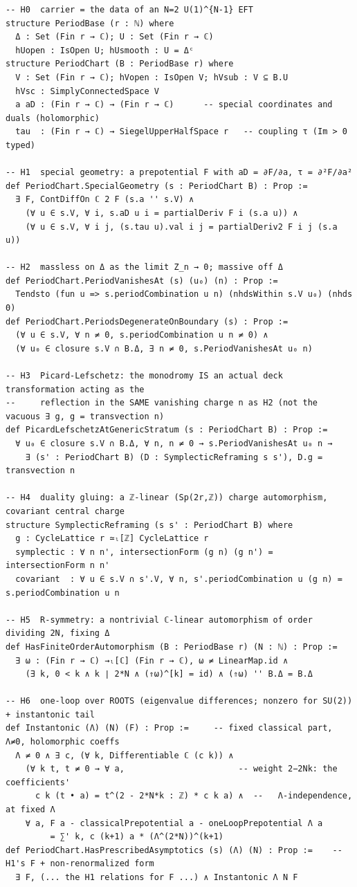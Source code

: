 \documentclass{article}
\theoremstyle{plain}
\theoremstyle{definition}
\numberwithin{equation}{section}
\begin{document}
\begin{Verbatim}
-- H0  carrier = the data of an N=2 U(1)^{N-1} EFT
structure PeriodBase (r : ℕ) where
  Δ : Set (Fin r → ℂ); U : Set (Fin r → ℂ)
  hUopen : IsOpen U; hUsmooth : U = Δᶜ
structure PeriodChart (B : PeriodBase r) where
  V : Set (Fin r → ℂ); hVopen : IsOpen V; hVsub : V ⊆ B.U
  hVsc : SimplyConnectedSpace V
  a aD : (Fin r → ℂ) → (Fin r → ℂ)      -- special coordinates and duals (holomorphic)
  tau  : (Fin r → ℂ) → SiegelUpperHalfSpace r   -- coupling τ (Im > 0 typed)

-- H1  special geometry: a prepotential F with aD = ∂F/∂a, τ = ∂²F/∂a²
def PeriodChart.SpecialGeometry (s : PeriodChart B) : Prop :=
  ∃ F, ContDiffOn ℂ 2 F (s.a '' s.V) ∧
    (∀ u ∈ s.V, ∀ i, s.aD u i = partialDeriv F i (s.a u)) ∧
    (∀ u ∈ s.V, ∀ i j, (s.tau u).val i j = partialDeriv2 F i j (s.a u))

-- H2  massless on Δ as the limit Z_n → 0; massive off Δ
def PeriodChart.PeriodVanishesAt (s) (u₀) (n) : Prop :=
  Tendsto (fun u => s.periodCombination u n) (nhdsWithin s.V u₀) (nhds 0)
def PeriodChart.PeriodsDegenerateOnBoundary (s) : Prop :=
  (∀ u ∈ s.V, ∀ n ≠ 0, s.periodCombination u n ≠ 0) ∧
  (∀ u₀ ∈ closure s.V ∩ B.Δ, ∃ n ≠ 0, s.PeriodVanishesAt u₀ n)

-- H3  Picard-Lefschetz: the monodromy IS an actual deck transformation acting as the
--     reflection in the SAME vanishing charge n as H2 (not the vacuous ∃ g, g = transvection n)
def PicardLefschetzAtGenericStratum (s : PeriodChart B) : Prop :=
  ∀ u₀ ∈ closure s.V ∩ B.Δ, ∀ n, n ≠ 0 → s.PeriodVanishesAt u₀ n →
    ∃ (s' : PeriodChart B) (D : SymplecticReframing s s'), D.g = transvection n

-- H4  duality gluing: a ℤ-linear (Sp(2r,ℤ)) charge automorphism, covariant central charge
structure SymplecticReframing (s s' : PeriodChart B) where
  g : CycleLattice r ≃ₗ[ℤ] CycleLattice r
  symplectic : ∀ n n', intersectionForm (g n) (g n') = intersectionForm n n'
  covariant  : ∀ u ∈ s.V ∩ s'.V, ∀ n, s'.periodCombination u (g n) = s.periodCombination u n

-- H5  R-symmetry: a nontrivial ℂ-linear automorphism of order dividing 2N, fixing Δ
def HasFiniteOrderAutomorphism (B : PeriodBase r) (N : ℕ) : Prop :=
  ∃ ω : (Fin r → ℂ) →ₗ[ℂ] (Fin r → ℂ), ω ≠ LinearMap.id ∧
    (∃ k, 0 < k ∧ k ∣ 2*N ∧ (⇑ω)^[k] = id) ∧ (⇑ω) '' B.Δ = B.Δ

-- H6  one-loop over ROOTS (eigenvalue differences; nonzero for SU(2)) + instantonic tail
def Instantonic (Λ) (N) (F) : Prop :=     -- fixed classical part, Λ≠0, holomorphic coeffs
  Λ ≠ 0 ∧ ∃ c, (∀ k, Differentiable ℂ (c k)) ∧
    (∀ k t, t ≠ 0 → ∀ a,                       -- weight 2−2Nk: the coefficients'
      c k (t • a) = t^(2 - 2*N*k : ℤ) * c k a) ∧  --   Λ-independence, at fixed Λ
    ∀ a, F a - classicalPrepotential a - oneLoopPrepotential Λ a
         = ∑' k, c (k+1) a * (Λ^(2*N))^(k+1)
def PeriodChart.HasPrescribedAsymptotics (s) (Λ) (N) : Prop :=    -- H1's F + non-renormalized form
  ∃ F, (... the H1 relations for F ...) ∧ Instantonic Λ N F


\end{Verbatim}
\end{document}

